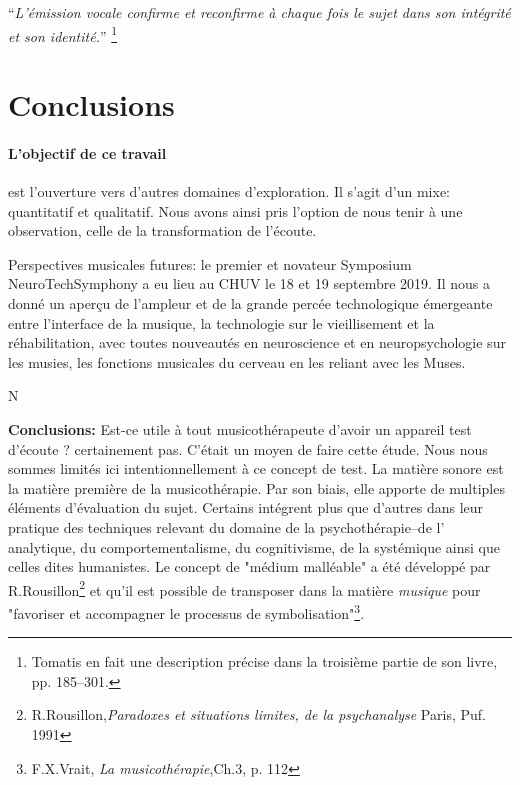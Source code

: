\enquote{\emph{L'émission vocale confirme et reconfirme à chaque
fois le sujet dans son intégrité et son identité.}}%
\autocite{tomatis:loreille}\footnote{Tomatis en fait une description précise dans la troisième partie de
son livre, pp. 185--301.}



  



\section{Conclusions}

\label{Conclusions}

\paragraph{L'objectif de ce travail} est l'ouverture vers d'autres
domaines d'exploration. 
  Il s'agit d'un mixe: quantitatif et qualitatif. Nous avons ainsi pris l'option de nous tenir à une
  observation, celle de la transformation de l'écoute.
  
  Perspectives musicales futures: le premier et novateur Symposium
  NeuroTechSymphony a eu lieu au CHUV le 18 et 19 septembre 2019. Il  nous a
  donné un aperçu de l'ampleur et de la grande percée technologique
  émergeante entre  l'interface de la musique, la technologie sur le
  vieillisement et la
  réhabilitation, avec toutes
nouveautés en neuroscience et en neuropsychologie sur les musies, les
fonctions musicales du cerveau en les reliant avec les Muses.

N


\textbf{Conclusions:}
        Est-ce utile à tout musicothérapeute d'avoir un appareil test d'écoute ? certainement pas. C'était un moyen de faire cette étude.
     Nous nous sommes  limités ici intentionnellement
     à ce concept de test.
 La matière sonore est la matière première de la  musicothérapie. 
 Par son biais, elle  apporte de multiples éléments d'évaluation du
 sujet. 
 Certains  intégrent plus que d'autres dans leur pratique des techniques relevant du domaine de la psychothérapie--de l' analytique, 
  du comportementalisme, du cognitivisme, de la  systémique ainsi que
  celles dites humanistes.  Le concept de "médium malléable" a été
  développé par  R.Rousillon\footnote{R.Rousillon,\textit{Paradoxes et situations limites,  
  		de la psychanalyse} Paris, Puf. 1991} 
  et qu'il est possible de transposer dans la matière \textit{musique} 
  pour "favoriser et accompagner le processus 
  de symbolisation"\footnote{F.X.Vrait, \textit{La musicothérapie},Ch.3, p. 112}.

